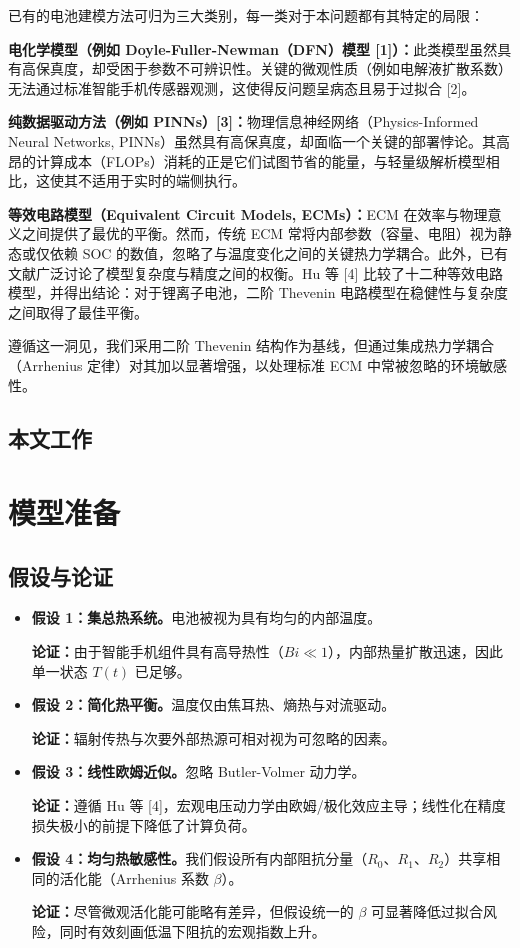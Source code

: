 \documentclass[11pt,a4paper]{ctexart}
\begin{document}
已有的电池建模方法可归为三大类别，每一类对于本问题都有其特定的局限：

\textbf{电化学模型（例如 Doyle-Fuller-Newman（DFN）模型 [1]）：}此类模型虽然具有高保真度，却受困于参数不可辨识性。关键的微观性质（例如电解液扩散系数）无法通过标准智能手机传感器观测，这使得反问题呈病态且易于过拟合 [2]。

\textbf{纯数据驱动方法（例如 PINNs）[3]：}物理信息神经网络（Physics-Informed Neural Networks, PINNs）虽然具有高保真度，却面临一个关键的部署悖论。其高昂的计算成本（FLOPs）消耗的正是它们试图节省的能量，与轻量级解析模型相比，这使其不适用于实时的端侧执行。

\textbf{等效电路模型（Equivalent Circuit Models, ECMs）：}ECM 在效率与物理意义之间提供了最优的平衡。然而，传统 ECM 常将内部参数（容量、电阻）视为静态或仅依赖 SOC 的数值，忽略了与温度变化之间的关键热力学耦合。此外，已有文献广泛讨论了模型复杂度与精度之间的权衡。Hu 等 [4] 比较了十二种等效电路模型，并得出结论：对于锂离子电池，二阶 Thevenin 电路模型在稳健性与复杂度之间取得了最佳平衡。

遵循这一洞见，我们采用二阶 Thevenin 结构作为基线，但通过集成热力学耦合（Arrhenius 定律）对其加以显著增强，以处理标准 ECM 中常被忽略的环境敏感性。

\subsection{本文工作}

\section{模型准备}

\subsection{假设与论证}

\begin{itemize}[leftmargin=1.6em,itemsep=0.4em]
\item \textbf{假设 1：集总热系统。}电池被视为具有均匀的内部温度。

\textbf{论证：}由于智能手机组件具有高导热性（$Bi \ll 1$），内部热量扩散迅速，因此单一状态 $T(t)$ 已足够。

\item \textbf{假设 2：简化热平衡。}温度仅由焦耳热、熵热与对流驱动。

\textbf{论证：}辐射传热与次要外部热源可相对视为可忽略的因素。

\item \textbf{假设 3：线性欧姆近似。}忽略 Butler-Volmer 动力学。

\textbf{论证：}遵循 Hu 等 [4]，宏观电压动力学由欧姆/极化效应主导；线性化在精度损失极小的前提下降低了计算负荷。

\item \textbf{假设 4：均匀热敏感性。}我们假设所有内部阻抗分量（$R_0$、$R_1$、$R_2$）共享相同的活化能（Arrhenius 系数 $\beta$）。

\textbf{论证：}尽管微观活化能可能略有差异，但假设统一的 $\beta$ 可显著降低过拟合风险，同时有效刻画低温下阻抗的宏观指数上升。
\end{itemize}
\end{document}
